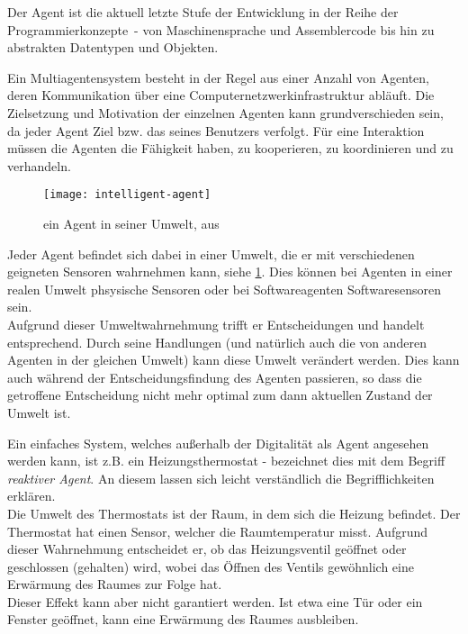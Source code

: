 Der Agent ist die aktuell letzte Stufe der Entwicklung in der Reihe der \mbox{Programmierkonzepte -} von Maschinensprache und Assemblercode bis hin zu abstrakten Datentypen und Objekten.

Ein Multiagentensystem besteht in der Regel aus einer Anzahl von Agenten, deren Kommunikation über eine Computernetzwerkinfrastruktur abläuft.
Die Zielsetzung und Motivation der einzelnen Agenten kann grundverschieden sein, da jeder Agent  Ziel bzw. das seines Benutzers verfolgt.
Für eine Interaktion müssen die Agenten die Fähigkeit haben, zu kooperieren, zu koordinieren und zu verhandeln.

\begin{figure}[hptb]
 \centering
 \texttt{[image: intelligent-agent]}
 \caption[ein Agent in seiner Umwelt]
 		{ein Agent in seiner Umwelt, aus \cite{multiagent}}
 \label{figure:intelligent-agent}
\end{figure}
\noindent
Jeder Agent befindet sich dabei in einer Umwelt, die er mit verschiedenen geigneten Sensoren wahrnehmen kann, siehe \cref{figure:intelligent-agent}.
Dies können bei Agenten in einer realen Umwelt phsysische Sensoren oder bei Softwareagenten Softwaresensoren sein.
\\
Aufgrund dieser Umweltwahrnehmung trifft er Entscheidungen und handelt entsprechend.
Durch seine Handlungen (und natürlich auch die von anderen Agenten in der gleichen Umwelt) kann diese Umwelt verändert werden.
Dies kann auch während der Entscheidungsfindung des Agenten passieren, so dass die getroffene Entscheidung nicht mehr optimal zum dann aktuellen Zustand der Umwelt ist.

Ein einfaches System, welches außerhalb der Digitalität als Agent angesehen werden kann, ist z.B. ein Heizungsthermostat - \cite{artificialintelligence} bezeichnet dies mit dem Begriff \textit{reaktiver Agent}.
An diesem lassen sich leicht verständlich die Begrifflichkeiten erklären.
\\
Die Umwelt des Thermostats ist der Raum, in dem sich die Heizung befindet.
Der Thermostat hat einen Sensor, welcher die Raumtemperatur misst.
Aufgrund dieser Wahrnehmung entscheidet er, ob das Heizungsventil geöffnet oder geschlossen (gehalten) wird, wobei das Öffnen des Ventils gewöhnlich eine Erwärmung des Raumes zur Folge hat.
\\
Dieser Effekt kann aber nicht garantiert werden.
Ist etwa eine Tür oder ein Fenster geöffnet, kann eine Erwärmung des Raumes ausbleiben.

